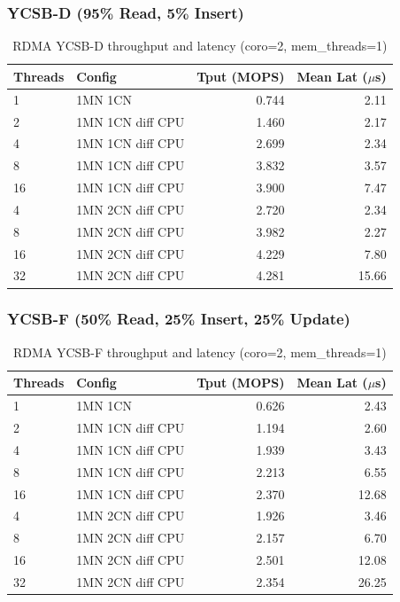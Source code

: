 \documentclass[11pt,a4paper]{article}
\begin{document}
\subsubsection{YCSB-D (95\% Read, 5\% Insert)}

\begin{table}[H]
\centering
\caption{RDMA YCSB-D throughput and latency (coro=2, mem\_threads=1)}
\label{tab:rdma-ycsbd}
\small
\begin{tabular}{@{}llrr@{}}
\toprule
\textbf{Threads} & \textbf{Config} & \textbf{Tput (MOPS)} & \textbf{Mean Lat ($\mu$s)} \\
\midrule
1  & 1MN 1CN             & 0.744 & 2.11 \\
2  & 1MN 1CN diff CPU    & 1.460 & 2.17 \\
4  & 1MN 1CN diff CPU    & 2.699 & 2.34 \\
8  & 1MN 1CN diff CPU    & 3.832 & 3.57 \\
16 & 1MN 1CN diff CPU    & 3.900 & 7.47 \\
\midrule
4  & 1MN 2CN diff CPU    & 2.720 & 2.34 \\
8  & 1MN 2CN diff CPU    & 3.982 & 2.27 \\
16 & 1MN 2CN diff CPU    & 4.229 & 7.80 \\
32 & 1MN 2CN diff CPU    & 4.281 & 15.66 \\
\bottomrule
\end{tabular}
\end{table}

\subsubsection{YCSB-F (50\% Read, 25\% Insert, 25\% Update)}

\begin{table}[H]
\centering
\caption{RDMA YCSB-F throughput and latency (coro=2, mem\_threads=1)}
\label{tab:rdma-ycsbf}
\small
\begin{tabular}{@{}llrr@{}}
\toprule
\textbf{Threads} & \textbf{Config} & \textbf{Tput (MOPS)} & \textbf{Mean Lat ($\mu$s)} \\
\midrule
1  & 1MN 1CN             & 0.626 & 2.43 \\
2  & 1MN 1CN diff CPU    & 1.194 & 2.60 \\
4  & 1MN 1CN diff CPU    & 1.939 & 3.43 \\
8  & 1MN 1CN diff CPU    & 2.213 & 6.55 \\
16 & 1MN 1CN diff CPU    & 2.370 & 12.68 \\
\midrule
4  & 1MN 2CN diff CPU    & 1.926 & 3.46 \\
8  & 1MN 2CN diff CPU    & 2.157 & 6.70 \\
16 & 1MN 2CN diff CPU    & 2.501 & 12.08 \\
32 & 1MN 2CN diff CPU    & 2.354 & 26.25 \\
\bottomrule
\end{tabular}
\end{table}
\end{document}
